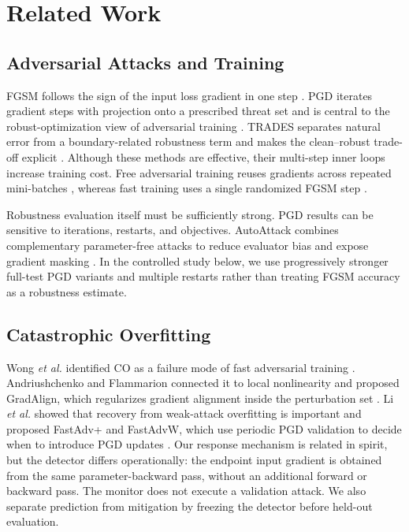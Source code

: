 \section{Related Work}
\subsection{Adversarial Attacks and Training}
FGSM follows the sign of the input loss gradient in one step
\cite{goodfellow2015explaining}. PGD iterates gradient steps with projection
onto a prescribed threat set and is central to the robust-optimization view of
adversarial training \cite{madry2018towards}. TRADES separates natural error
from a boundary-related robustness term and makes the clean--robust trade-off
explicit \cite{zhang2019trades}. Although these methods are effective, their
multi-step inner loops increase training cost. Free adversarial training reuses
gradients across repeated mini-batches \cite{shafahi2019adversarial}, whereas
fast training uses a single randomized FGSM step \cite{wong2020fast}.

Robustness evaluation itself must be sufficiently strong. PGD results can be
sensitive to iterations, restarts, and objectives. AutoAttack combines
complementary parameter-free attacks to reduce evaluator bias and expose
gradient masking \cite{croce2020reliable}. In the controlled study below, we
use progressively stronger full-test PGD variants and multiple restarts rather
than treating FGSM accuracy as a robustness estimate.

\subsection{Catastrophic Overfitting}
Wong \emph{et al.} identified CO as a failure mode of fast adversarial
training \cite{wong2020fast}. Andriushchenko and Flammarion connected it to
local nonlinearity and proposed GradAlign, which regularizes gradient alignment
inside the perturbation set \cite{andriushchenko2020understanding}. Li
\emph{et al.} showed that recovery from weak-attack overfitting is important
and proposed FastAdv+ and FastAdvW, which use periodic PGD validation to decide
when to introduce PGD updates \cite{li2020towards}. Our response mechanism is
related in spirit, but the detector differs operationally: the endpoint input
gradient is obtained from the same parameter-backward pass, without an
additional forward or backward pass. The monitor does not execute a validation
attack. We also separate prediction from mitigation by freezing the detector
before held-out evaluation.


